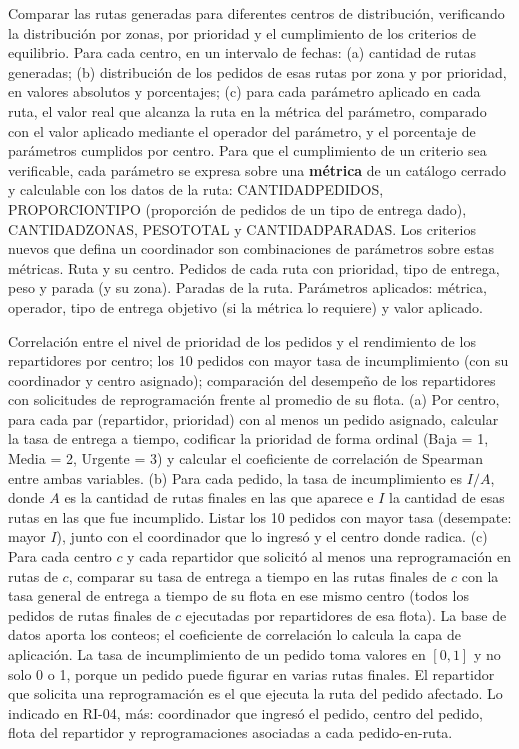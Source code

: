 \documentclass[11pt,a4paper]{article}
\newcommand{\ubrk}{\textunderscore\allowbreak}
\newcommand{\campo}[1]{\textnormal{\ttfamily\let\_\ubrk #1}}
\begin{document}
{Comparar las rutas generadas para diferentes centros de distribución, verificando la distribución por zonas, por prioridad y el cumplimiento de los criterios de equilibrio.}
{Para cada centro, en un intervalo de fechas: (a) cantidad de rutas generadas; (b) distribución de los pedidos de esas rutas por zona y por prioridad, en valores absolutos y porcentajes; (c) para cada parámetro aplicado en cada ruta, el valor real que alcanza la ruta en la métrica del parámetro, comparado con el valor aplicado mediante el operador del parámetro, y el porcentaje de parámetros cumplidos por centro.}
{Para que el cumplimiento de un criterio sea verificable, cada parámetro se expresa sobre una \textbf{métrica} de un catálogo cerrado y calculable con los datos de la ruta: \campo{CANTIDAD\_PEDIDOS}, \campo{PROPORCION\_TIPO} (proporción de pedidos de un tipo de entrega dado), \campo{CANTIDAD\_ZONAS}, \campo{PESO\_TOTAL} y \campo{CANTIDAD\_PARADAS}. Los criterios nuevos que defina un coordinador son combinaciones de parámetros sobre estas métricas.}
{Ruta y su centro. Pedidos de cada ruta con prioridad, tipo de entrega, peso y parada (y su zona). Paradas de la ruta. Parámetros aplicados: métrica, operador, tipo de entrega objetivo (si la métrica lo requiere) y valor aplicado.}

{Correlación entre el nivel de prioridad de los pedidos y el rendimiento de los repartidores por centro; los 10 pedidos con mayor tasa de incumplimiento (con su coordinador y centro asignado); comparación del desempeño de los repartidores con solicitudes de reprogramación frente al promedio de su flota.}
{(a) Por centro, para cada par (repartidor, prioridad) con al menos un pedido asignado, calcular la tasa de entrega a tiempo, codificar la prioridad de forma ordinal (Baja = 1, Media = 2, Urgente = 3) y calcular el coeficiente de correlación de Spearman entre ambas variables. (b) Para cada pedido, la tasa de incumplimiento es $I/A$, donde $A$ es la cantidad de rutas finales en las que aparece e $I$ la cantidad de esas rutas en las que fue incumplido. Listar los 10 pedidos con mayor tasa (desempate: mayor $I$), junto con el coordinador que lo ingresó y el centro donde radica. (c) Para cada centro $c$ y cada repartidor que solicitó al menos una reprogramación en rutas de $c$, comparar su tasa de entrega a tiempo en las rutas finales de $c$ con la tasa general de entrega a tiempo de su flota en ese mismo centro (todos los pedidos de rutas finales de $c$ ejecutadas por repartidores de esa flota).}
{La base de datos aporta los conteos; el coeficiente de correlación lo calcula la capa de aplicación. La tasa de incumplimiento de un pedido toma valores en $[0,1]$ y no solo 0 o 1, porque un pedido puede figurar en varias rutas finales. El repartidor que solicita una reprogramación es el que ejecuta la ruta del pedido afectado.}
{Lo indicado en RI-04, más: coordinador que ingresó el pedido, centro del pedido, flota del repartidor y reprogramaciones asociadas a cada pedido-en-ruta.}
\end{document}
